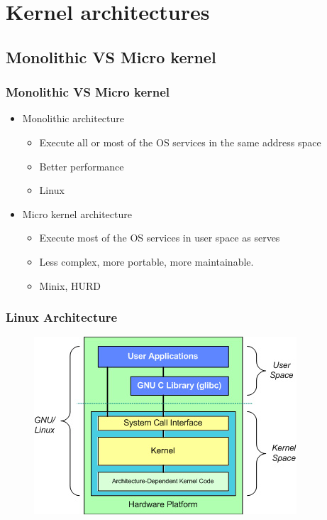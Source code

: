 \documentclass{beamer}
\begin{document}
\section{Kernel architectures}

\subsection{Monolithic VS Micro kernel}

\begin{frame}
\frametitle{Monolithic VS Micro kernel}

\begin{itemize}

\item Monolithic architecture
  \begin{itemize}
  \item Execute all or most of the OS services in the same address space
  \item Better performance 
  \item Linux
  \end{itemize}

\item Micro kernel architecture
  \begin{itemize}
  \item Execute most of the OS services in user space as serves
  \item Less complex, more portable, more maintainable.
  \item Minix, HURD
  \end{itemize}

\end{itemize}

\end{frame}


\begin{frame}
\frametitle{Linux Architecture}

\begin{figure}
  \centering
	\includegraphics[scale=0.6,clip=true]{figs/Linux_Architecture.png}
  \label{fig:Linux_Architecture}
\end{figure}

\end{frame}
\end{document}
